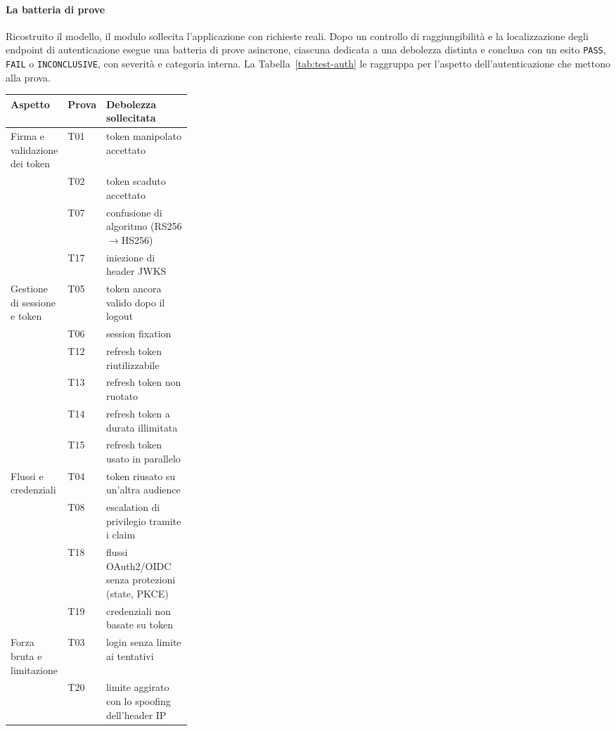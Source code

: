 \paragraph{La batteria di prove}
Ricostruito il modello, il modulo sollecita l'applicazione con richieste reali.
Dopo un controllo di raggiungibilità e la localizzazione degli endpoint di
autenticazione esegue una batteria di prove asincrone, ciascuna dedicata a una
debolezza distinta e conclusa con un esito \texttt{PASS}, \texttt{FAIL} o
\texttt{INCONCLUSIVE}, con severità e categoria interna. La
Tabella~\ref{tab:test-auth} le raggruppa per l'aspetto dell'autenticazione che
mettono alla prova.

\begin{table}[!htbp]
  \centering
  \small
  \linespread{1.0}\selectfont
  \begin{tabularx}{\linewidth}{@{}>{\raggedright\arraybackslash}p{0.3\linewidth}lX@{}}
    \toprule
    \textbf{Aspetto} & \textbf{Prova} & \textbf{Debolezza sollecitata} \\
    \midrule
    Firma e validazione dei token & T01 & token manipolato accettato \\
    & T02 & token scaduto accettato \\
    & T07 & confusione di algoritmo (RS256$\rightarrow$HS256) \\
    & T17 & iniezione di header JWKS \\
    \midrule
    Gestione di sessione e token & T05 & token ancora valido dopo il logout \\
    & T06 & session fixation \\
    & T12 & refresh token riutilizzabile \\
    & T13 & refresh token non ruotato \\
    & T14 & refresh token a durata illimitata \\
    & T15 & refresh token usato in parallelo \\
    \midrule
    Flussi e credenziali & T04 & token riusato su un'altra audience \\
    & T08 & escalation di privilegio tramite i claim \\
    & T18 & flussi OAuth2/OIDC senza protezioni (state, PKCE) \\
    & T19 & credenziali non basate su token \\
    \midrule
    Forza bruta e limitazione & T03 & login senza limite ai tentativi \\
    & T20 & limite aggirato con lo spoofing dell'header IP \\

\end{tabularx}
\end{table}
